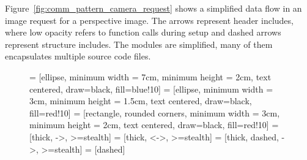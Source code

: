 Figure~\ref{fig:comm_pattern_camera_request} shows a simplified data flow in an image request for a perspective image. The arrows represent header includes, where low opacity refers to function calls during setup and dashed arrows represent structure includes. The modules are simplified, many of them encapsulates multiple source code files.

\begin{figure}[!htb]
    \centering
     = [ellipse, minimum width = 7cm, minimum height = 2cm, text centered, draw=black, fill=blue!10]
     = [ellipse, minimum width = 3cm, minimum height = 1.5cm, text centered, draw=black, fill=red!10]
     = [rectangle, rounded corners, minimum width = 3cm, minimum height = 2cm, text centered, draw=black, fill=red!10]
     = [thick, ->, >=stealth]
     = [thick, <->, >=stealth]
     = [thick, dashed, ->, >=stealth]
     = [dashed]
    
    \newcommand{\drawdashedarrow}{\raisebox{2pt}
    {\tikz{\draw[dashedarrow](0mm,0mm)--(4.25mm,0mm);}}}
    \newcommand{\drawarrow}{\raisebox{2pt}
    {\tikz{
        \draw[singlearrow](0mm,0mm)--(4.25mm,0mm);
        \draw[doublearrow](5mm,0mm)--(9.25mm,0mm);}}}
    \newcommand{\drawopacitydarrow}{\raisebox{2pt}
    {\tikz{
        \draw[singlearrow, opacity=0.5](0mm,0mm)--(4.25mm,0mm);
        \draw[doublearrow, opacity=0.5](5mm,0mm)--(9.25mm,0mm);}}}
    
\end{figure}
